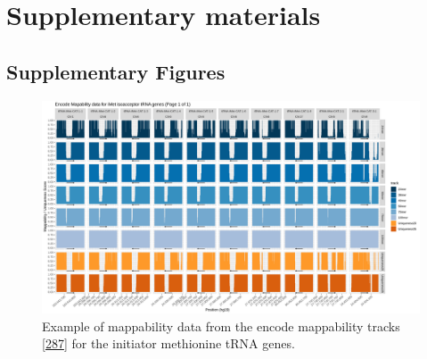 \documentclass[
]{book}
\begin{document}
\newpage

\hypertarget{supplementary-materials}{%
\section*{Supplementary materials}\label{supplementary-materials}}

\hypertarget{supplementary-figures}{%
\subsection{Supplementary Figures}\label{supplementary-figures}}

\begin{figure}

{\centering \includegraphics[width=1\linewidth]{./figs/mappability-iMet1} 

}

\caption{Example of mappability data from the encode mappability tracks {[}\protect\hyperlink{ref-Derrien2012}{287}{]} for the initiator methionine tRNA genes.}\label{fig:mappabilityiMet1}
\end{figure}
\end{document}
